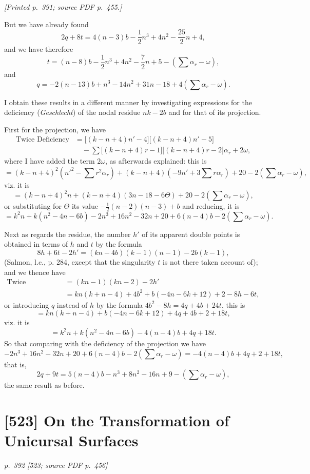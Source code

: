 \documentclass[11pt,a4paper]{article}
\newcommand{\sourcepage}[2]{\par\smallskip\noindent\textit{[Printed p.~#1; source PDF p.~#2.]}\par\smallskip}
\newcommand{\pagemarker}[3]{\par\bigskip\noindent\textit{p.~#1 [#2; source PDF p.~#3]}\par\smallskip}
\begin{document}
\sourcepage{391}{455}
But we have already found
\[
2q+8t=4(n-3)b-\frac12n^3+4n^2-\frac{25}{2}n+4,
\]
and we have therefore
\[
t=(n-8)b-\frac12n^3+4n^2-\frac72 n+5-(\sum\alpha_r-\omega),
\]
and
\[
q=-2(n-13)b+n^3-14n^2+31n-18+4(\sum\alpha_r-\omega).
\]

I obtain these results in a different manner by investigating expressions for the
deficiency (\textit{Geschlecht}) of the nodal residue $nk-2b$ and for that of its projection.

First for the projection, we have
\[
\begin{aligned}
\text{Twice Deficiency}
&=\bigl[(k-n+4)n'-4\bigr]\bigl[(k-n+4)n'-5\bigr]\\
&\quad-\sum\bigl[(k-n+4)r-1\bigr]\bigl[(k-n+4)r-2\bigr]\alpha_r+2\omega,
\end{aligned}
\]
where I have added the term $2\omega$, as afterwards explained: this is
\[
=(k-n+4)^2\left(n'^2-\sum r^2\alpha_r\right)
+(k-n+4)\left(-9n'+3\sum r\alpha_r\right)
+20-2(\sum\alpha_r-\omega),
\]
viz. it is
\[
=(k-n+4)^2n+(k-n+4)(3n-18-6\Theta)+20-2(\sum\alpha_r-\omega),
\]
or substituting for $\Theta$ its value $-\frac12(n-2)(n-3)+b$ and reducing, it is
\[
=k^2n+k(n^2-4n-6b)-2n^3+16n^2-32n+20+6(n-4)b
-2(\sum\alpha_r-\omega).
\]

Next as regards the residue, the number $h'$ of its apparent double points is obtained
in terms of $h$ and $t$ by the formula
\[
8h+6t-2h'=(kn-4b)(k-1)(n-1)-2b(k-1),
\]
(Salmon, l.c., p. 284, except that the singularity $t$ is not there taken account of);
and we thence have
\[
\begin{aligned}
\text{Twice Deficiency}
&=(kn-1)(kn-2)-2h'\\
&=kn(k+n-4)+4b^2+b(-4n-6k+12)+2-8h-6t,
\end{aligned}
\]
or introducing $q$ instead of $h$ by the formula $4b^2-8h=4q+4b+24t$, this is
\[
=kn(k+n-4)+b(-4n-6k+12)+4q+4b+2+18t,
\]
viz. it is
\[
=k^2n+k(n^2-4n-6b)-4(n-4)b+4q+18t.
\]
So that comparing with the deficiency of the projection we have
\[
-2n^3+16n^2-32n+20+6(n-4)b-2(\sum\alpha_r-\omega)
=-4(n-4)b+4q+2+18t,
\]
that is,
\[
2q+9t=5(n-4)b-n^3+8n^2-16n+9-(\sum\alpha_r-\omega),
\]
the same result as before.

\clearpage
\section*{[523] On the Transformation of Unicursal Surfaces}
\pagemarker{392}{523}{456}
\end{document}
